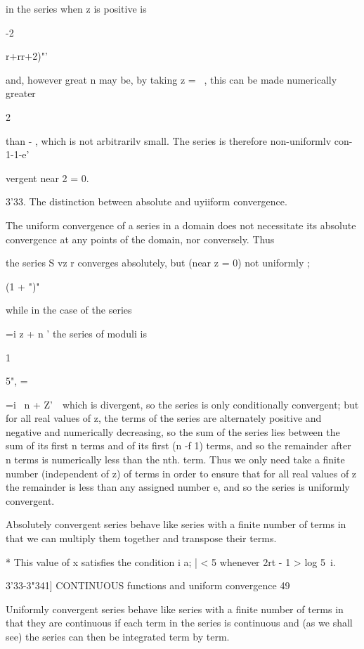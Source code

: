 in the series when z is positive is 

-2 

r+rr+2)"' 

and, however great n may be, by taking z = ~, this can be made numerically greater 

2 

than -  , which is not arbitrarilv small. The series is therefore non-uniformlv con- 
1-1-e' 

vergent near 2 = 0. 

3'33. The distinction between absolute and uyiiform convergence. 

The uniform convergence of a series in a domain does not necessitate 
its absolute convergence at any points of the domain, nor conversely. Thus 

the series S vz  r converges absolutely, but (near z = 0) not uniformly ; 

(1 +  ")" 

while in the case of the series 

 =i z  + n ' 
the series of moduli is 

1 

5", = 



 =i \ n + Z'\ \   
which is divergent, so the series is only conditionally convergent; but for all 
real values of z, the terms of the series are alternately positive and negative 
and numerically decreasing, so the sum of the series lies between the sum of 
its first n terms and of its first (n -f 1) terms, and so the remainder after 
n terms is numerically less than the nth. term. Thus we only need take a 
finite number (independent of z) of terms in order to ensure that for all real 
values of z the remainder is less than any assigned number e, and so the 
series is uniformly convergent. 

Absolutely convergent series behave like series with a finite number of 
terms in that we can multiply them together and transpose their terms. 

* This value of x satisfies the condition i a; | < 5 whenever 2rt - 1 > log 5~i. 



3'33-3"341] CONTINUOUS functions and uniform convergence 49 

Uniformly convergent series behave like series with a finite number of 
terms in that they are continuous if each term in the series is continuous 
and (as we shall see) the series can then be integrated term by term. 

